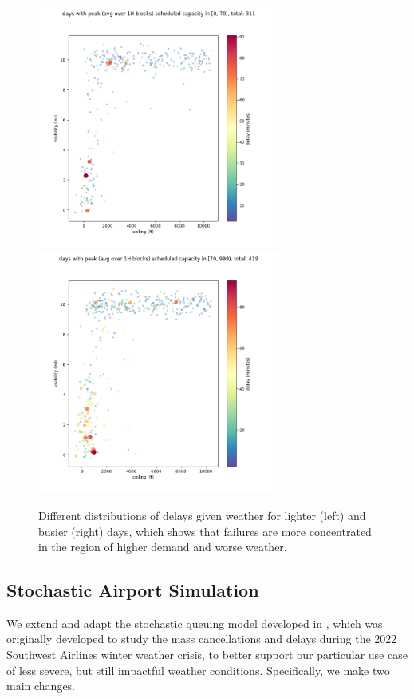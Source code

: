 \begin{figure}[htb!]
    \centering
    \includegraphics[height=8.0cm]{media/lga-analysis-15.png}
    \includegraphics[height=8.0cm]{media/lga-analysis-16.png}
    \caption{Different distributions of delays given weather for lighter (left) and busier (right) days, which shows that failures are more concentrated in the region of higher demand and worse weather.}
    \label{fig:bubble2d-split}
\end{figure}

\subsection{Stochastic Airport Simulation}

We extend and adapt the stochastic queuing model developed in \cite{dawson2024breaking, michael_peng_probing_2024}, which was originally developed to study the mass cancellations and delays during the 2022 Southwest Airlines winter weather crisis, to better support our particular use case of less severe, but still impactful weather conditions. Specifically, we make two main changes.

